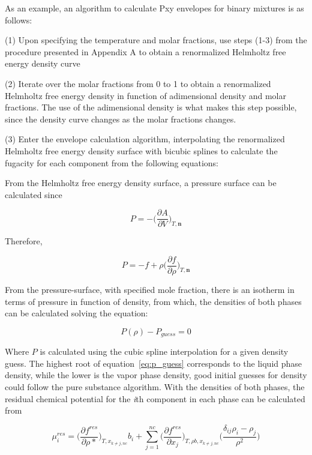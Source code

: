 \documentclass[preprint,12pt,3p]{elsarticle}
\begin{document}
\begin{appendices}
	As an example, an algorithm to calculate Pxy envelopes for binary mixtures is as follows:
	
	(1) Upon specifying the temperature and molar fractions, use steps (1-3) from the procedure presented in Appendix A to obtain a renormalized Helmholtz free energy density curve
	
	(2) Iterate over the molar fractions from 0 to 1 to obtain a renormalized Helmholtz free energy density in function of adimensional density and molar fractions. The use of the adimensional density is what makes this step possible, since the density curve changes as the molar fractions changes.
	
	(3) Enter the envelope calculation algorithm, interpolating the renormalized Helmholtz free energy density surface with bicubic splines to calculate the fugacity for each component from the following equations:
	
	From the Helmholtz free energy density surface, a pressure surface can be calculated since
	
\begin{equation} \label{eq:press_helm_deriv}
	P = -\Bigg(\frac{\partial A}{\partial V}\Bigg)_{T,\textbf{n}}
\end{equation}

	Therefore,

\begin{equation} \label{eq:press_helm_deriv2}
	P = -f+\rho\Bigg(\frac{\partial f}{\partial \rho}\Bigg)_{T,\textbf{n}}
\end{equation}

	From the pressure-surface, with specified mole fraction, there is an isotherm in terms of pressure in function of density, from which, the densities of both phases can be calculated solving the equation:
	
\begin{equation} \label{eq:p_guess}
	P(\rho) - P_{guess} = 0
\end{equation}	
	
	Where $P$ is calculated using the cubic spline interpolation for a given density guess. The highest root of equation~\ref{eq:p_guess} corresponds to the liquid phase density, while the lower is the vapor phase density, good initial guesses for density could follow the pure substance algorithm. With the densities of both phases, the residual chemical potential for the \textit{i}th component in each phase can be calculated from
	
\begin{equation} \label{eq:chem_pot_i}
	\mu_{i}^{res} = \Bigg(\frac{\partial f^{res}}{\partial \rho{*}}\Bigg)_{T,x_{k\neq j,nc}}b_{i}+\sum_{j=1}^{nc} \Bigg(\frac{\partial f^{res}}{\partial x_{j}}\Bigg)_{T,\rho b,x_{k\neq j,nc}} \Bigg(\frac{\delta_{ij} \rho_{i}-\rho_{j}}{\rho^{2}}\Bigg)
\end{equation} 


\end{appendices}
\end{document}
